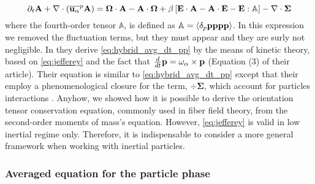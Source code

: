 \begin{equation}
    \partial_t \textbf{A}
    + \mathbf{\nabla}\cdot (
        \overline{\textbf{u}_\alpha}^{p}\textbf{A}
    )
    =
    \mathbf{\Omega} \cdot \textbf{A}
    - \textbf{A} \cdot \mathbf{\Omega}
    + \beta\left[
        \textbf{E} \cdot \textbf{A}
        -\textbf{A} \cdot \textbf{E}
        - \textbf{E} : \mathbb{A}
    \right]
    - \mathbf{\nabla}\cdot \mathbf{\Sigma}
    \label{eq:hybrid_avg_dt_pp}
\end{equation}
where the fourth-order tensor $\mathbb{A}$, is defined as $\mathbb{A} = \left<\delta_p \textbf{pppp}\right>$.
In this expression we removed the fluctuation terms, but they must appear and they are surly not negligible. 
In \citet{wang2008objective} they derive \ref{eq:hybrid_avg_dt_pp} by the means of kinetic theory, based on \ref{eq:jefferey} and the fact that $\frac{d}{dt} \textbf{p} = \omega_\alpha \times \textbf{p}$ (Equation (3) of their article).
Their equation is similar to \ref{eq:hybrid_avg_dt_pp} except that their employ a phenomenological closure for the term, $\div \mathbf{\Sigma}$, which account for particles interactions .
Anyhow, we showed how it is possible to derive the orientation tensor conservation equation, commonly used in fiber field theory, from the second-order moments of mass's equation. 
However, \ref{eq:jefferey} is valid in low inertial regime only. 
Therefore, it is indispensable to consider a more general framework when working with inertial particles. 

\subsubsection{Averaged equation for the particle phase}

